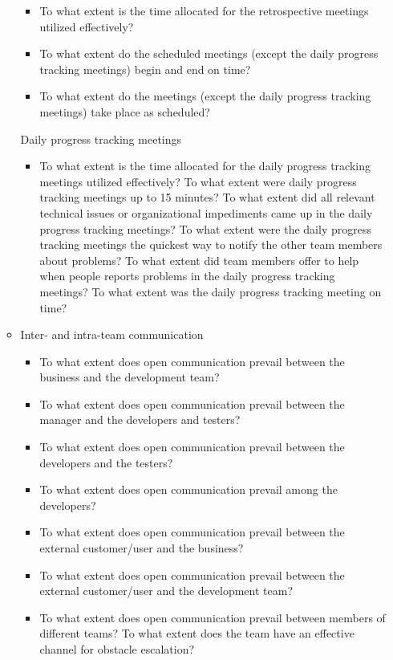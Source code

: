 \begin{itemize}
\begin{itemize}
\begin{itemize}
					\item To what extent is the time allocated for the retrospective meetings utilized effectively? 
					\item To what extent do the scheduled meetings (except the daily progress tracking meetings) begin and end on time? 
					\item To what extent do the meetings (except the daily progress tracking meetings) take place as scheduled? 
				\end{itemize}
			\indicatorAddition Daily progress tracking meetings
				\begin{itemize}
					\item To what extent is the time allocated for the daily progress tracking meetings utilized effectively? 
					\addition To what extent were daily progress tracking meetings up to 15 minutes?
					\addition To what extent did all relevant technical issues or organizational impediments came up in the daily progress tracking meetings?
					\addition To what extent were the daily progress tracking meetings the quickest way to notify the other team members about problems?
					\addition To what extent did team members offer to help when people reports problems in the daily progress tracking meetings?
					\addition To what extent was the daily progress tracking meeting on time?
				\end{itemize}
			\item Inter- and intra-team communication
				\begin{itemize}
					\item To what extent does open communication prevail between the business and the development team? 
					\item To what extent does open communication prevail between the manager and the developers and testers? 
					\item To what extent does open communication prevail between the developers and the testers? 
					\item To what extent does open communication prevail among the developers? 
					\item To what extent does open communication prevail between the external customer/user and the business? 
					\item To what extent does open communication prevail between the external customer/user and the development team? 
					\item To what extent does open communication prevail between members of different teams?
					\addition To what extent does the team have an effective channel for obstacle escalation?

\end{itemize}
\end{itemize}
\end{itemize}
